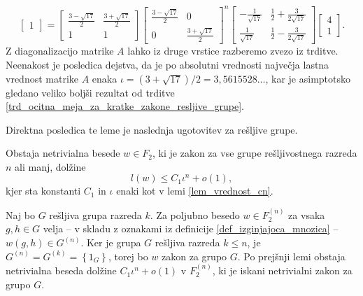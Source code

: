 \documentclass[mat1, tisk]{fmfdelo}
\numberwithin{equation}{section}  %
\begin{document}
\begin{dokaz}
\begin{equation*}
\begin{bmatrix}
        1 
    \end{bmatrix} = \begin{bmatrix}
        \frac{3 - \sqrt{17} }{2} & \frac{3 + \sqrt{17} }{2}\\
        1 & 1
    \end{bmatrix} \begin{bmatrix}
        \frac{3 - \sqrt{17} }{2} & 0\\
        0 & \frac{3 + \sqrt{17} }{2}
    \end{bmatrix}^{n} 
    \begin{bmatrix}
        - \frac{1}{\sqrt{17} } & \frac{1}{2} + \frac{3}{2 \sqrt{17} }\\
        \frac{1}{\sqrt{17} } & \frac{1}{2} - \frac{3}{2 \sqrt{17} }
    \end{bmatrix}
    \begin{bmatrix}
        4 \\
        1 
    \end{bmatrix}.
    \end{equation*}  
    Z diagonalizacijo matrike $A$ lahko iz druge vrstice razberemo zvezo iz trditve. Neenakost je posledica dejstva,
     da je po absolutni vrednosti največja lastna vrednost matrike $A$ enaka $\iota = (3 + \sqrt{17})  / 2 = 3{,}5615528 \ldots$, kar je asimptotsko gledano veliko boljši rezultat od trditve \ref{trd_ocitna_meja_za_kratke_zakone_resljive_grupe}.
\end{dokaz} 

Direktna posledica te leme je naslednja ugotovitev za rešljive grupe.

\begin{trditev}
\label{trd_osnovna_ocena_resljive_grupe} 
 Obstaja netrivialna besede $w \in F_2$, ki je zakon za vse grupe rešljivostnega razreda $n$ ali manj, dolžine \begin{equation*}
 l(w) \le C_1 \iota^{n} + o(1),
 \end{equation*}  
 kjer sta konstanti $C_1$ in $\iota$ enaki kot v lemi \ref{lem_vrednost_cn}.  
\end{trditev}
\begin{dokaz}
    Naj bo $G$ rešljiva grupa razreda $k$. Za poljubno besedo $w \in F_2^{(n)}$ za vsaka $g, h \in G$ velja -- v skladu z oznakami iz definicije \ref{def_izginjajoca_mnozica} -- $w(g,h) \in G^{(n)}$. 
    Ker je grupa $G$ rešljiva razreda $k \le n$, je $G^{(n)} = G^{(k)} = \left\{  1_G \right\}$,
    torej bo $w$ zakon za grupo $G$. Po prejšnji lemi obstaja netrivialna beseda dolžine $C_1 \iota^{n} +o(1)$ v $F_2^{(n)}$, ki je iskani netrivialni zakon za grupo $G$.
\end{dokaz}
\end{document}
